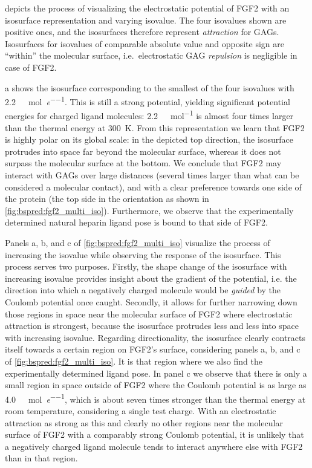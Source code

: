  depicts the process of visualizing the
electrostatic potential of FGF2 with an isosurface representation and varying
isovalue. The four isovalues shown are positive ones, and the isosurfaces
therefore represent \textit{attraction} for GAGs. Isosurfaces for isovalues of
comparable absolute value and opposite sign are \enquote{within} the molecular
surface, i.e.\ electrostatic GAG \textit{repulsion} is negligible in case of
FGF2.

a shows the isosurface corresponding to the
smallest of the four isovalues with
\SI{2.2}{\kilo\calory\per\mole\per\elementarycharge}. This is still a strong
potential, yielding significant potential energies for charged ligand molecules:
\SI{2.2}{\kilo\calory\per\mole} is almost four times larger than the thermal
energy at \SI{300}{\kelvin}. From this representation we learn that FGF2 is
highly polar on its global scale: in the depicted top direction, the isosurface
protrudes into space far beyond the molecular surface, whereas it does not
surpass the molecular surface at the bottom. We conclude that FGF2 may interact
with GAGs over large distances (several times larger than what can be
considered a molecular contact), and with a clear preference towards one side
of the protein (the top side in the orientation as shown in
\cref{fig:bspred:fgf2_multi_iso}). Furthermore, we observe that the
experimentally determined natural heparin ligand pose is bound to that side of
FGF2.

Panels a, b, and c of \cref{fig:bspred:fgf2_multi_iso} visualize the process of
increasing the isovalue while observing the response of the isosurface. This
process serves two purposes. Firstly, the shape change of the isosurface with
increasing isovalue provides insight about the gradient of the potential, i.e.
the direction into which a negatively charged molecule would be \textit{guided}
by the Coulomb potential once caught. Secondly, it allows for further narrowing
down those regions in space near the molecular surface of FGF2 where
electrostatic attraction is strongest, because the isosurface protrudes less and
less into space with increasing isovalue. Regarding directionality, the
isosurface clearly contracts itself towards a certain region on FGF2's surface,
considering panels a, b, and c of \cref{fig:bspred:fgf2_multi_iso}. It is that
region where we also find the experimentally determined ligand pose. In panel c
we observe that there is only a small region in space outside of FGF2 where the
Coulomb potential is as large as
\SI{4.0}{\kilo\calory\per\mole\per\elementarycharge}, which is about seven times
stronger than the thermal energy at room temperature, considering a single test
charge. With an electrostatic attraction as strong as this and clearly no other
regions near the molecular surface of FGF2 with a comparably strong Coulomb
potential, it is unlikely that a negatively charged ligand molecule tends to
interact anywhere else with FGF2 than in that region.

